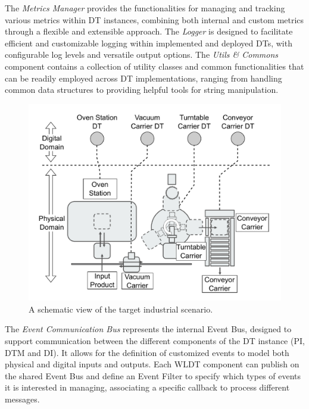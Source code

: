 The \textit{Metrics Manager} provides the functionalities for managing and tracking various metrics within DT instances, combining both internal and custom metrics through a flexible and extensible approach.
The \textit{Logger} is designed to facilitate efficient and customizable logging within implemented and deployed DTs, with configurable log levels and versatile output options.
The \textit{Utils \& Commons} component contains a collection of utility classes and common functionalities that can be readily employed across DT implementations, ranging from handling common data structures to providing helpful tools for string manipulation.

\begin{figure}[th!]
    \setlength{\belowcaptionskip}{-8pt}
    \centering
    \includegraphics[width=\columnwidth]{figures/engineering-wldt/fischer-layout-first-level-dt.pdf}
    \caption{A schematic view of the target industrial scenario.}
    \label{fig:discher-dt-first-level}
\end{figure}

The \textit{Event Communication Bus} represents the internal Event Bus, designed to support communication between the different components of the DT instance (PI, DTM and DI). It allows for the definition of customized events to model both physical and digital inputs and outputs. Each WLDT component can publish on the shared Event Bus and define an Event Filter to specify which types of events it is interested in managing, associating a specific callback to process different messages.

